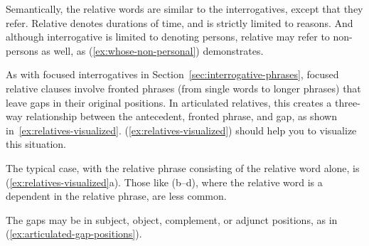 Semantically, the relative words are similar to the interrogatives, except that they refer. Relative  denotes durations of time, and  is strictly limited to reasons. And although interrogative  is limited to denoting persons, relative  may refer to non-persons as well, as (\ref{ex:whose-non-personal}) demonstrates.

\begin{samepage}
    \ea\label{ex:whose-non-personal}
        \z
    \z
\end{samepage}

As with focused interrogatives in Section~\ref{sec:interrogative-phrases}, focused relative clauses involve fronted phrases (from single words to longer phrases) that leave gaps in their original positions. In articulated relatives, this creates a three-way relationship between the antecedent, fronted phrase, and gap, as shown in~\ref{ex:relatives-visualized}.  (\ref{ex:relatives-visualized}) should help you to visualize this situation.

The typical case, with the relative phrase consisting of the relative word alone, is (\ref{ex:relatives-visualized}a). Those like (b--d), where the relative word is a dependent in the relative phrase, are less common.

The gaps may be in subject, object, complement, or adjunct positions, as in (\ref{ex:articulated-gap-positions}).

\ea \label{ex:relatives-visualized}
    \z
\z

